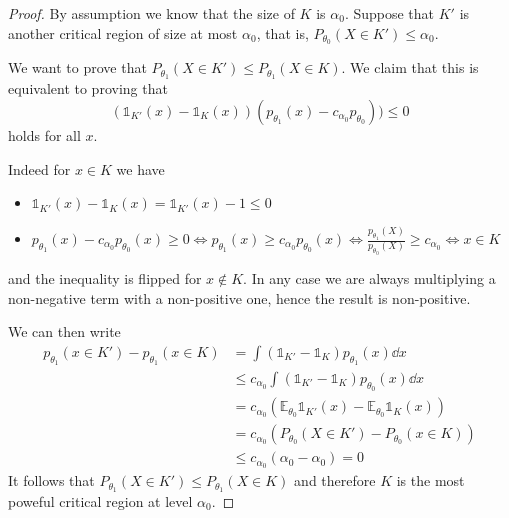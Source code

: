 \documentclass[12pt]{extarticle}
\newcommand{\E}{\mathds{E}}
\begin{document}
\begin{proof}
	By assumption we know that the size of $K$ is $\alpha_0$.
	Suppose that $K'$ is another critical region of size at most $\alpha_0$,
	that is, $P_{\theta_0}(X \in K') \leq \alpha_0$.

	We want to prove that
	$P_{\theta_1}(X \in K') \leq P_{\theta_1}(X \in K)$.
	We claim that this is equivalent to proving that
	\begin{equation}
		(\mathds{1}_{K'}(x) - \mathds{1}_{K}(x))(p_{\theta_1}(x) - c_{\alpha_0}p_{\theta_0})) \leq 0
	\end{equation}
	holds for all $x$.

	Indeed for $x \in K$ we have
	\begin{itemize}
		\item $\mathds 1_{K'}(x) - \mathds 1_{K}(x) = \mathds 1_{K'}(x) -1 \leq 0$
		\item $p_{\theta_1}(x) - c_{\alpha_0}p_{\theta_0}(x) \geq 0 \iff p_{\theta_1}(x) \geq c_{\alpha_0}p_{\theta_0}(x) \iff \frac{p_{\theta_1}(X)}{p_{\theta_0}(X)} \geq c_{\alpha_0} \iff x \in K$
	\end{itemize}
	and the inequality is flipped for $x \notin K$.
	In any case we are always multiplying a non-negative term with a non-positive one,
	hence the result is non-positive.

	We can then write
	\begin{align}
		p_{\theta_1}(x \in K') - p_{\theta_1}(x \in K) & = \int (\mathds 1_{K'} - \mathds 1_{K}) p_{\theta_1}(x) \dd x                   \\
		                                               & \leq c_{\alpha_0} \int (\mathds 1_{K'} - \mathds 1_{K}) p_{\theta_0}(x) \dd x   \\
		                                               & = c_{\alpha_0} (\E_{\theta_0} \mathds 1_{K'}(x) - \E_{\theta_0} \mathds 1_K(x)) \\
		                                               & = c_{\alpha_0} (P_{\theta_0}(X \in K') - P_{\theta_0}(x \in K))                 \\
		                                               & \leq c_{\alpha_0} (\alpha_0 - \alpha_0) = 0
	\end{align}
	It follows that $P_{\theta_1}(X \in K') \leq P_{\theta_1}(X \in K)$
	and therefore $K$ is the most poweful critical region at level $\alpha_0$.
\end{proof}
\end{document}
